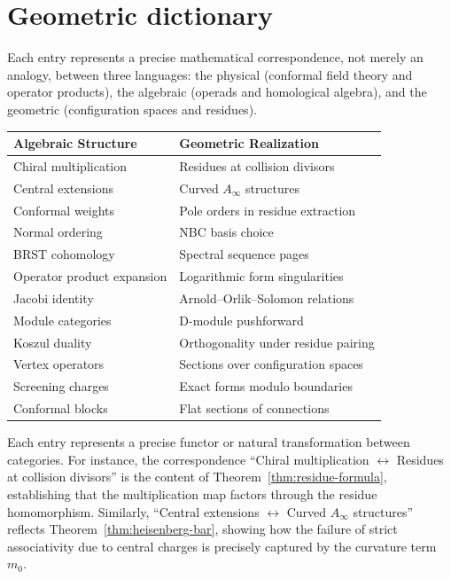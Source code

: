 \chapter{Geometric dictionary}
\label{app:geometric-dictionary}

Each entry represents a precise mathematical correspondence, not merely an analogy, between three languages: the physical (conformal field theory and operator products), the algebraic (operads and homological algebra), and the geometric (configuration spaces and residues).

\begin{center}
\begin{tabular}{|l|l|}
\hline
\textbf{Algebraic Structure} & \textbf{Geometric Realization} \\
\hline
Chiral multiplication & Residues at collision divisors \\
Central extensions & Curved $A_\infty$ structures \\
Conformal weights & Pole orders in residue extraction \\
Normal ordering & NBC basis choice \\
BRST cohomology & Spectral sequence pages \\
Operator product expansion & Logarithmic form singularities \\
Jacobi identity & Arnold--Orlik--Solomon relations \\
Module categories & D-module pushforward \\
Koszul duality & Orthogonality under residue pairing \\
Vertex operators & Sections over configuration spaces \\
Screening charges & Exact forms modulo boundaries \\
Conformal blocks & Flat sections of connections \\
\hline
\end{tabular}
\end{center}

\begin{remark}
Each entry represents a precise functor or natural transformation between categories. For instance, the correspondence ``Chiral multiplication $\leftrightarrow$ Residues at collision divisors'' is the content of Theorem~\ref{thm:residue-formula}, establishing that the multiplication map factors through the residue homomorphism. Similarly, ``Central extensions $\leftrightarrow$ Curved $A_\infty$ structures'' reflects Theorem~\ref{thm:heisenberg-bar}, showing how the failure of strict associativity due to central charges is precisely captured by the curvature term $m_0$.
\end{remark}



